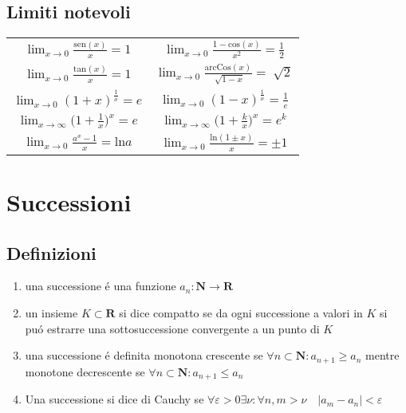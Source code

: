 \documentclass{exam}
\begin{document}
  \subsection{Limiti notevoli}
    \begin{center}
      \begin{tabular}{|c|c|}
        \(\displaystyle \lim_{x\to 0}\frac{\textrm{sen}(x)}{x}=1\)&
        \(\displaystyle \lim_{x\to 0}\frac{1-\textrm{cos}(x)}{x^2}=\frac{1}{2}\)\\
        \(\displaystyle \lim_{x\to 0}\frac{\textrm{tan}(x)}{x}=1\)&
        \(\displaystyle \lim_{x\to 0}\frac{\textrm{arcCos}(x)}{\sqrt[]{1-x}}=\sqrt[]{2}\)\\
        \(\displaystyle \lim_{x\to 0}(1+x)^\frac{1}{x}=e\)&
        \(\displaystyle \lim_{x\to 0}(1-x)^\frac{1}{x}=\frac{1}{e}\)\\
        \(\displaystyle \lim_{x\to \infty}\Big(1+\frac{1}{x}\Big)^x=e\)&
        \(\displaystyle \lim_{x\to \infty}\Big(1+\frac{k}{x}\Big)^x=e^k\)\\
        \(\displaystyle \lim_{x\to 0}\frac{a^x-1}{x}=\textrm{ln}{a}\)&
        \(\displaystyle \lim_{x\to 0}\frac{\textrm{ln}(1\pm x)}{x}=\pm 1\)\\
      \end{tabular}
    \end{center}
   \newpage





\section{Successioni}
  \subsection{Definizioni}
    \begin{enumerate}
      \item una successione \'e una funzione $a_{n}: \mathbf{N} \rightarrow \mathbf{R}$
      \item un insieme $K\subset \mathbf{R}$ si dice compatto se da ogni successione a valori in $K$
        si pu\'o estrarre una sottosuccessione convergente a un punto di $K$
      \item una successione \'e definita monotona crescente se $\forall n\subset \mathbf{N}:
        a_{n+1}\ge a_{n}$
        mentre monotone decrescente se $\forall n\subset \mathbf{N}: a_{n+1}\le a_{n}$ 
      \item Una successione si dice di Cauchy se $\forall \varepsilon>0 \exists \nu:
        \forall n,m>\nu \quad |a_{m}-a_{n}|<\varepsilon$  
     \end{enumerate}
  
\end{document}
